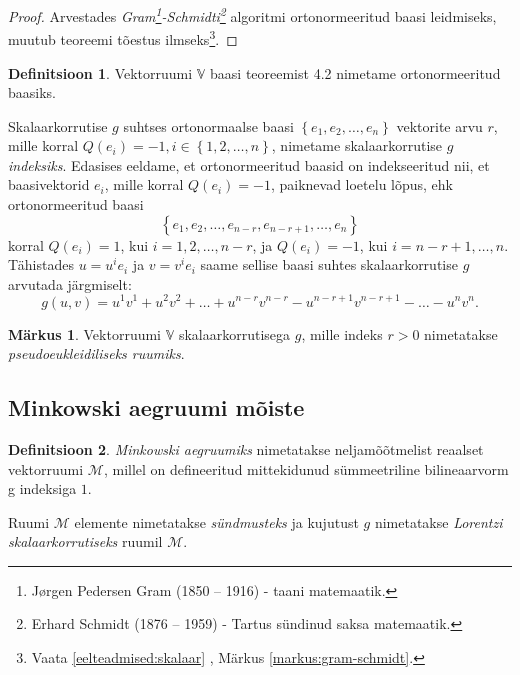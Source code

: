 \documentclass[12pt]{article}
\theoremstyle{plain}
\theoremstyle{definition}
\newtheorem{definitsioon}{Definitsioon}[section]
\newtheorem{markus}{Märkus}[section]
\numberwithin{equation}{section}
\def\V{{\mathbb V}}
\def\M{{\mathcal M}}
\begin{document}
\begin{proof}
Arvestades \textit{Gram\footnote{Jørgen Pedersen Gram (1850 – 1916) - 
taani matemaatik.}-Schmidti\footnote{Erhard Schmidt (1876 – 1959) - 
Tartus sündinud saksa matemaatik.}} algoritmi ortonormeeritud baasi 
leidmiseks, muutub teoreemi tõestus ilmseks\footnote{Vaata 
\ref{eelteadmised:skalaar} , 
Märkus \ref{markus:gram-schmidt}.}.
\end{proof}

\begin{definitsioon}
Vektorruumi $\V$ baasi teoreemist 4.2 nimetame ortonormeeritud 
baasiks.
\end{definitsioon}

Skalaarkorrutise $g$ suhtses ortonormaalse baasi 
$\left\lbrace e_1, e_2, \dots, e_n \right\rbrace$ vektorite arvu 
$r$, mille korral $Q \left(e_i\right) = -1, i \in 
\left\lbrace 1, 2, \dots, n \right\rbrace$, nimetame skalaarkorrutise 
$g$ \emph{indeksiks}.
Edasises eeldame, et ortonormeeritud baasid on indekseeritud nii, et 
baasivektorid $e_i$, mille korral $Q \left(e_i\right) = -1$, paiknevad 
loetelu lõpus, ehk ortonormeeritud baasi 
\[\left\lbrace e_1, e_2, \dots, e_{n-r}, e_{n-r+1}, 
\dots, e_n \right\rbrace\]
korral $Q \left(e_i\right) = 1$, kui $i = 1, 2, \dots, n-r$, ja 
$Q \left(e_i\right) = -1$, kui $i = n-r+1, \dots, n$. Tähistades 
$u = u^i e_i$ ja $v = v^i e_i$ saame sellise baasi suhtes 
skalaarkorrutise $g$ arvutada järgmiselt:
\[g\left(u, v\right) = u^1 v^1 + u^2 v^2 + \ldots + u^{n-r} v^{n-r} - 
u^{n-r+1} v^{n-r+1} - \ldots - u^n v^n.\]

\begin{markus}
Vektorruumi $\V$ skalaarkorrutisega $g$, mille indeks 
$r > 0$ nimetatakse \emph{pseudoeukleidiliseks ruumiks}.
\end{markus}


\subsection{Minkowski aegruumi mõiste}

\begin{definitsioon}
\emph{Minkowski aegruumiks} nimetatakse neljamõõtmelist reaalset 
vektorruumi $\M$, millel on defineeritud mittekidunud sümmeetriline 
bilineaarvorm g indeksiga $1$.

Ruumi $\M$ elemente nimetatakse \emph{sündmusteks} ja kujutust $g$ 
nimetatakse \emph{Lorentzi skalaarkorrutiseks} ruumil $\M$.
\end{definitsioon}
\end{document}
